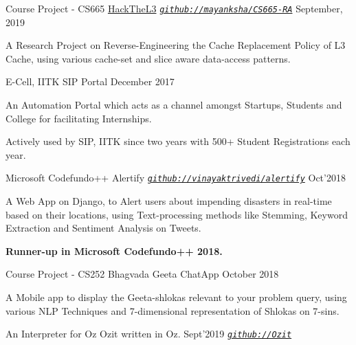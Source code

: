 
\begin{cventries}

  \cventry
  {Course Project - CS665}
  {\href{https://github.com/mayanksha/CS665-RA}{HackTheL3}}
  {\emph{\texttt{\href{https://github.com/mayanksha/CS665-RA}{github://mayanksha/CS665-RA}}}}
  {September, 2019}
  {
    \begin{cvitems}
    \item A Research Project on Reverse-Engineering the Cache Replacement Policy of L3 Cache, using various cache-set and slice aware data-access patterns.
    \end{cvitems}
  }

  \cventry
  {E-Cell, IITK}
  {SIP Portal}
  {}
  {December 2017}
  {
    \begin{cvitems}
    \item An Automation Portal which acts as a channel amongst Startups, Students and College for facilitating Internships. 
    \item Actively used by SIP, IITK since two years with 500+ Student Registrations each year.
    \end{cvitems}
  }

  \cventry
  {Microsoft Codefundo++}
  {Alertify}
  {\emph{\texttt{\href{https://github.com/vinayaktrivedi/alertify}{github://vinayaktrivedi/alertify}}}}
  {Oct'2018}
  {
    \begin{cvitems}
      \item A Web App on Django, to Alert users about impending disasters in real-time based on their locations, using Text-processing methods like Stemming, Keyword Extraction and Sentiment Analysis on Tweets. 
      \item \textbf{Runner-up in Microsoft Codefundo++ 2018.}
    \end{cvitems}
  }

  \cventry
  {Course Project - CS252}
  {Bhagvada Geeta ChatApp}
  {}
  {October 2018}
  {
    \begin{cvitems}
    \item A Mobile app to display the Geeta-shlokas relevant to your problem query, using various NLP Techniques and 7-dimensional representation of Shlokas on 7-sins. 
    \end{cvitems}
  }

  \smallcventry
  {An Interpreter for Oz}
  {Ozit}
  {written in Oz.}
  {Sept'2019}
  {{\emph{\texttt{\href{https://github.com/vinayaktrivedi/ozit}{github://Ozit}}}}}
  {}


\end{cventries}
